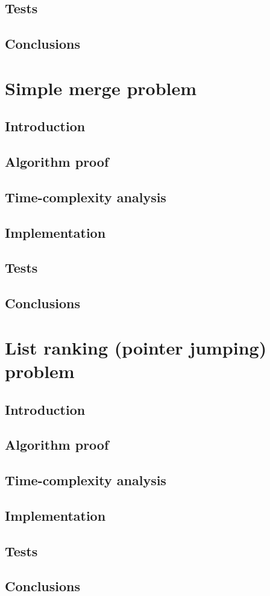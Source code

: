 \documentclass[a4paper,10pt,notitlepage]{article}
\begin{document}
\subsection{Tests}

\subsection{Conclusions}


\section{Simple merge problem}

\subsection{Introduction}

\subsection{Algorithm proof}

\subsection{Time-complexity analysis}

\subsection{Implementation}

\subsection{Tests}

\subsection{Conclusions}


\section{List ranking (pointer jumping) problem}

\subsection{Introduction}

\subsection{Algorithm proof}

\subsection{Time-complexity analysis}

\subsection{Implementation}

\subsection{Tests}

\subsection{Conclusions}
\end{document}
